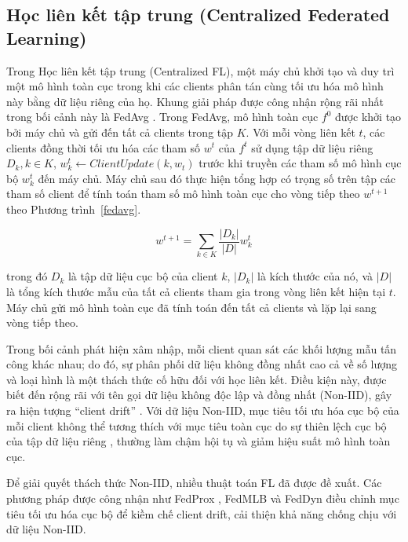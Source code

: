 \subsection{Học liên kết tập trung (Centralized Federated Learning)}
Trong Học liên kết tập trung (Centralized FL), một máy chủ khởi tạo và duy trì một mô hình toàn cục trong khi các clients phân tán cùng tối ưu hóa mô hình này bằng dữ liệu riêng của họ. Khung giải pháp được công nhận rộng rãi nhất trong bối cảnh này là FedAvg \cite{fedavg}. Trong FedAvg, mô hình toàn cục $f^0$ được khởi tạo bởi máy chủ và gửi đến tất cả clients trong tập $K$. Với mỗi vòng liên kết $t$, các clients đồng thời tối ưu hóa các tham số $w^t$ của $f^t$ sử dụng tập dữ liệu riêng $D_k, k\in K$, $w_k^t \leftarrow ClientUpdate(k, w_t)$ trước khi truyền các tham số mô hình cục bộ $w_k^t$ đến máy chủ. Máy chủ sau đó thực hiện tổng hợp có trọng số trên tập các tham số client để tính toán tham số mô hình toàn cục cho vòng tiếp theo $w^{t+1}$ theo Phương trình~\ref{fedavg}.

\begin{equation}
\label{fedavg}
w^{t+1} = \sum_{k \in K}\frac{|D_k|}{|D|}w_k^t
\end{equation}

trong đó $D_k$ là tập dữ liệu cục bộ của client $k$, $|D_k|$ là kích thước của nó, và $|D|$ là tổng kích thước mẫu của tất cả clients tham gia trong vòng liên kết hiện tại $t$. Máy chủ gửi mô hình toàn cục đã tính toán đến tất cả clients và lặp lại sang vòng tiếp theo.

Trong bối cảnh phát hiện xâm nhập, mỗi client quan sát các khối lượng mẫu tấn công khác nhau; do đó, sự phân phối dữ liệu không đồng nhất cao cả về số lượng và loại hình là một thách thức cố hữu đối với học liên kết. Điều kiện này, được biết đến rộng rãi với tên gọi dữ liệu không độc lập và đồng nhất (Non-IID), gây ra hiện tượng ``client drift'' \cite{he2022fedssd}. Với dữ liệu Non-IID, mục tiêu tối ưu hóa cục bộ của mỗi client không thể tương thích với mục tiêu toàn cục do sự thiên lệch cục bộ của tập dữ liệu riêng \cite{acar2021feddyn}, thường làm chậm hội tụ và giảm hiệu suất mô hình toàn cục.

Để giải quyết thách thức Non-IID, nhiều thuật toán FL đã được đề xuất. Các phương pháp được công nhận như FedProx \cite{li2020fedprox}, FedMLB \cite{kim2022fedmlb} và FedDyn \cite{acar2021feddyn} điều chỉnh mục tiêu tối ưu hóa cục bộ để kiềm chế client drift, cải thiện khả năng chống chịu với dữ liệu Non-IID.

